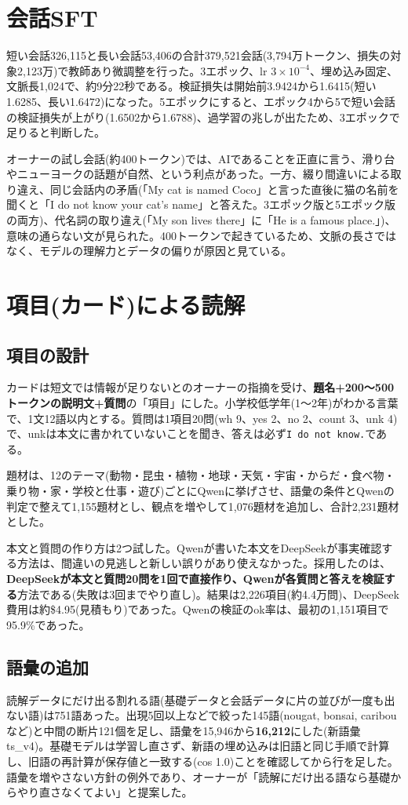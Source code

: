 \documentclass[a4paper,11pt]{article}
\newcommand{\IDK}{\texttt{I do not know.}}
\begin{document}
\section{会話SFT}
短い会話326,115と長い会話53,406の合計379,521会話(3,794万トークン、損失の対象2,123万)で教師あり微調整を行った。3エポック、lr $3\times10^{-4}$、埋め込み固定、文脈長1,024で、約9分22秒である。検証損失は開始前3.9424から1.6415(短い1.6285、長い1.6472)になった。5エポックにすると、エポック4から5で短い会話の検証損失が上がり(1.6502から1.6788)、過学習の兆しが出たため、3エポックで足りると判断した。

オーナーの試し会話(約400トークン)では、AIであることを正直に言う、滑り台やニューヨークの話題が自然、という利点があった。一方、綴り間違いによる取り違え、同じ会話内の矛盾(「My cat is named Coco」と言った直後に猫の名前を聞くと「I do not know your cat's name」と答えた。3エポック版と5エポック版の両方)、代名詞の取り違え(「My son lives there」に「He is a famous place.」)、意味の通らない文が見られた。400トークンで起きているため、文脈の長さではなく、モデルの理解力とデータの偏りが原因と見ている。

\section{項目(カード)による読解}
\subsection{項目の設計}
カードは短文では情報が足りないとのオーナーの指摘を受け、\textbf{題名+200〜500トークンの説明文+質問}の「項目」にした。小学校低学年(1〜2年)がわかる言葉で、1文12語以内とする。質問は1項目20問(wh 9、yes 2、no 2、count 3、unk 4)で、unkは本文に書かれていないことを聞き、答えは必ず\IDK である。

題材は、12のテーマ(動物・昆虫・植物・地球・天気・宇宙・からだ・食べ物・乗り物・家・学校と仕事・遊び)ごとにQwenに挙げさせ、語彙の条件とQwenの判定で整えて1,155題材とし、観点を増やして1,076題材を追加し、合計2,231題材とした。

本文と質問の作り方は2つ試した。Qwenが書いた本文をDeepSeekが事実確認する方法は、間違いの見逃しと新しい誤りがあり使えなかった。採用したのは、\textbf{DeepSeekが本文と質問20問を1回で直接作り、Qwenが各質問と答えを検証する}方法である(失敗は3回までやり直し)。結果は2,226項目(約4.4万問)、DeepSeek費用は約\$4.95(見積もり)であった。Qwenの検証のok率は、最初の1,151項目で95.9\%であった。

\subsection{語彙の追加}
読解データにだけ出る割れる語(基礎データと会話データに片の並びが一度も出ない語)は751語あった。出現5回以上などで絞った145語(nougat, bonsai, caribouなど)と中間の断片121個を足し、語彙を15,946から\textbf{16,212}にした(新語彙ts\_v4)。基礎モデルは学習し直さず、新語の埋め込みは旧語と同じ手順で計算し、旧語の再計算が保存値と一致する(cos 1.0)ことを確認してから行を足した。語彙を増やさない方針の例外であり、オーナーが「読解にだけ出る語なら基礎からやり直さなくてよい」と提案した。
\end{document}
